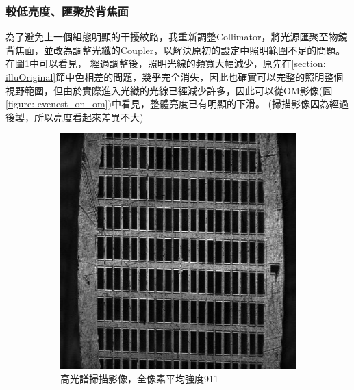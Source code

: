 \documentclass[12pt]{article}
\begin{document}
\subsubsection{較低亮度、匯聚於背焦面} \label{illuDark}
為了避免上一個組態明顯的干擾紋路，我重新調整Collimator，將光源匯聚至物鏡背焦面，並改為調整光纖的Coupler，以解決原初的設定中照明範圍不足的問題。在圖\ref{figure: evenest_on}中可以看見，
經過調整後，照明光線的頻寬大幅減少，原先在\ref{section: illuOriginal}節中色相差的問題，幾乎完全消失，因此也確實可以完整的照明整個視野範圍，但由於實際進入光纖的光線已經減少許多，因此可以從OM影像(圖\ref{figure: evenest_on_om})中看見，整體亮度已有明顯的下滑。
(掃描影像因為經過後製，所以亮度看起來差異不大)
\begin{figure}
    \centering
    \begin{subfigure}[t]{0.45\textwidth}
        \centering
        \includegraphics[width=\linewidth]{on_evenest.jpg}
        \caption{高光譜掃描影像，全像素平均強度911}
        \label{figure: evenest_on}
    \end{subfigure}
    \begin{subfigure}[t]{0.45\textwidth}
        \centering

\end{subfigure}
\end{figure}
\end{document}
